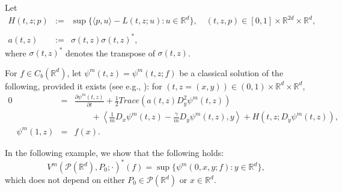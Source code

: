 \documentclass[12pt]{article}
\begin{document}
Let 
\begin{eqnarray}
H(t,z;p)&:=&\sup\{\langle p,u\rangle -L(t,z;u):u\in\mathbb{R}^d\},\quad (t,z,p)\in [0,1]\times \mathbb{R}^{2d}\times\mathbb{R}^{d},\nonumber\\
\\
a(t,z)&:=&\sigma(t,z)\sigma(t,z)^*,\label{2.56}
\end{eqnarray}
where $\sigma(t,z)^*$ denotes the transpose of $\sigma(t,z)$.

For $f\in C_b(\mathbb{R}^d)$,
let $\psi^m(t,z)=\psi^m(t,z;f)$ be a classical solution of the following,
provided it exists (see e.g., \cite{M2021}): for $(t,z=(x,y))\in (0,1)\times \mathbb{R}^d\times\mathbb{R}^d$,
\begin{eqnarray}
0&=&\frac{\partial\psi^m(t,z)}{\partial t}+\frac{1}{2}Trace(a(t,z)D^2_y\psi^m(t,z))\label{2.33.0}\\
&&\qquad 
+\left\langle \frac{1}{m} D_x\psi^m(t,z)-\frac{\gamma}{m}D_y\psi^m(t,z), y\right\rangle+H(t,z;D_y\psi^m(t,z)),\nonumber\\
\quad \psi^m(1,z)&=&f(x).\label{2.34.0}
\end{eqnarray}

In the following example, we show that the following holds:
\begin{equation}\label{2.33.-1}
V^m(\mathcal{P}(\mathbb{R}^d ),P_0;\cdot)^*(f)=\sup\{\psi^m(0,x,y;f):y\in\mathbb{R}^d \},
\end{equation}
which does not depend on either $P_0\in \mathcal{P}(\mathbb{R}^d)$ or $x\in  \mathbb{R}^d$.
\end{document}
